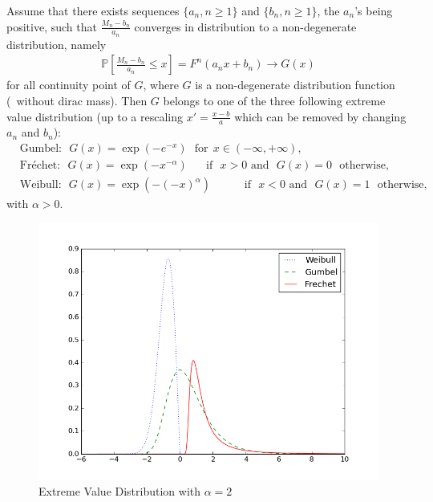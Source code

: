 \begin{theorem}
\label{thm:univariate-evt}
Assume that there exists sequences
$\{a_n, n \ge 1\}$ and $\{b_n, n \ge 1\}$, the $a_n$'s being positive, such that $\frac{M_n-b_n}{a_n} $ converges in distribution to a non-degenerate distribution, namely
\begin{align}
\label{eq:hyp-GEV}
\mathbb{P}\left[ \frac{M_n-b_n}{a_n} \le x \right] = F^n(a_n x + b_n) \to G(x)
\end{align}
for all continuity point of $G$, where $G$ is a non-degenerate distribution function (\ie~without dirac mass).
Then $G$ belongs to one of the three following extreme value distribution (up to a rescaling $x' = \frac{x-b}{a}$ which can be removed by changing $a_n$ and $b_n$):
\begin{align*}
&\text{Gumbel:}~~~  G(x) = \exp \left( -e^{-x} \right)~~~\text{for}~~ x \in (-\infty, +\infty),\\
&\text{Fréchet:}~~~ G(x) = \exp \left(-x^{-\alpha}\right) ~~~\text{~~~if~~} x > 0 \text{~and~~} G(x)=0 \text{~~otherwise},\\
&\text{Weibull:}~~~G(x) = \exp \left(-(-x)^{\alpha}\right) ~~~~~~~~~\text{~~~if~~} x < 0 \text{~and~~} G(x)=1 \text{~~otherwise},
\end{align*}
with $\alpha>0$.
\end{theorem}
\begin{figure}[!ht]
  \centering
  \includegraphics[width=.9\linewidth]{fig_source/GEV.png}
  \caption{Extreme Value Distribution with $\alpha = 2$}
  \label{fig:GEV}
\end{figure}

